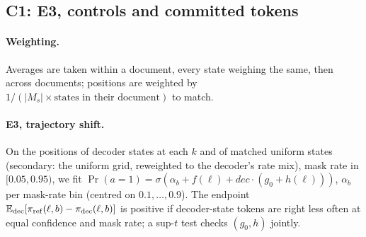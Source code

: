 
\renewcommand{\dbltopfraction}{0.95}\renewcommand{\textfraction}{0.05}\setcounter{dbltopnumber}{3}%
\subsection{C1: E3, controls and committed tokens}
\label{sec:c1-app}

\paragraph{Weighting.}
Averages are taken within a document, every state weighing the same, then across documents;
positions are weighted by $1/(|M_s|\times\text{states in their document})$ to match.

\paragraph{E3, trajectory shift.}
On the positions of decoder states at each $k$ and of matched uniform states (secondary: the
uniform grid, reweighted to the decoder's rate mix), mask rate in $[0.05,0.95)$, we fit
$\Pr(a{=}1)=\sigma(\alpha_b+f(\ell)+\textit{dec}\cdot(g_0+h(\ell)))$, $\alpha_b$ per mask-rate bin (centred on $0.1,\dots,0.9$).
The endpoint $\mathbb{E}_{\mathrm{dec}}[\pi_{\mathrm{ref}}(\ell,b)-\pi_{\mathrm{dec}}(\ell,b)]$ is positive if
decoder-state tokens are right less often at equal confidence and mask rate; a sup-$t$ test checks $(g_0,h)$ jointly.

